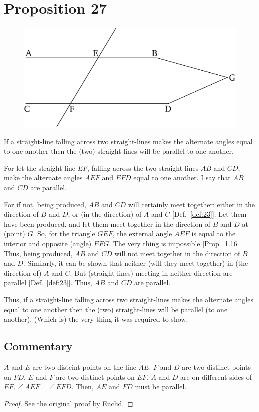 \chapter*{Proposition 27}

\begin{figure}[ht]
    \begin{center}
    \includegraphics[width=0.5\linewidth]{figures/fig27e.eps}
    \label{fig:prop_27}
    \end{center}
\end{figure}

If a straight-line falling across two straight-lines makes  the alternate
angles equal to one another then the (two) straight-lines will be parallel to
one another.

For let the straight-line $EF$, falling across the two straight-lines $AB$ and
$CD$, make the alternate angles $AEF$ and $EFD$ equal to one another.
I say that $AB$ and $CD$ are parallel.

For if not, being produced, $AB$ and $CD$ will certainly meet together:
either in the direction of $B$ and $D$, or (in the
direction) of $A$ and $C$ [Def.~\ref{def:23}]. Let them have been
produced, and let them meet together in the direction of $B$ and $D$ at
 (point) $G$. So, for the triangle $GEF$, the external angle
$AEF$ is equal to the interior and opposite (angle) $EFG$. The
very thing is impossible [Prop.~1.16]. Thus, being produced, $AB$ and $CD$
will not meet together in the direction of $B$ and $D$. Similarly, 
it can be shown that neither (will they meet together) in (the
direction of) $A$ and $C$. But  (straight-lines) meeting in neither
direction are parallel [Def.~\ref{def:23}]. Thus, $AB$ and $CD$ are parallel.

Thus, if a straight-line falling across two straight-lines makes  the alternate
angles equal to one another then the (two) straight-lines will be parallel (to
one another). (Which is) the very thing it was required to show.


\section*{Commentary}

\begin{proposition}\label{proposition_27}\leanok
    $A$ and $E$ are two distcint points on the line $AE$. $F$ and $D$ are two distinct points on $FD$. $E$ and $F$ are two distinct points on $EF$. $A$ and $D$ are on different sides of $EF$. $\angle~AEF = \angle~EFD$. Then, $AE$ and $FD$ must be parallel.
\end{proposition}
\begin{proof}
    \leanok
    See the original proof by Euclid.
\end{proof}

